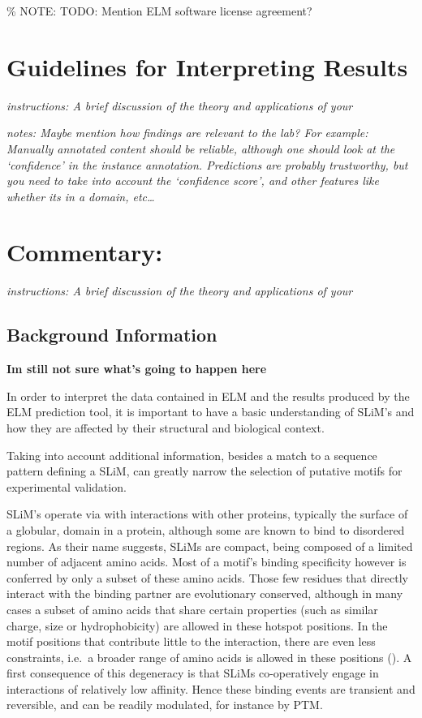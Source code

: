 \% NOTE: TODO: Mention ELM software license agreement?

\section{Guidelines for Interpreting
Results}\label{guidelines-for-interpreting-results}

\emph{instructions: A brief discussion of the theory and applications of
your}

\emph{notes: Maybe mention how findings are relevant to the lab? For
example: Manually annotated content should be reliable, although one
should look at the `confidence' in the instance annotation. Predictions
are probably trustworthy, but you need to take into account the
`confidence score', and other features like whether its in a domain,
etc\ldots{}}

\section{Commentary:}\label{commentary}

\emph{instructions: A brief discussion of the theory and applications of
your}

\subsection{Background Information}\label{background-information}

\textbf{Im still not sure what's going to happen here}

In order to interpret the data contained in ELM and the results produced
by the ELM prediction tool, it is important to have a basic
understanding of SLiM's and how they are affected by their structural
and biological context.

Taking into account additional information, besides a match to a
sequence pattern defining a SLiM, can greatly narrow the selection of
putative motifs for experimental validation.

SLiM's operate via with interactions with other proteins, typically the
surface of a globular, domain in a protein, although some are known to
bind to disordered regions. As their name suggests, SLiMs are compact,
being composed of a limited number of adjacent amino acids. Most of a
motif's binding specificity however is conferred by only a subset of
these amino acids. Those few residues that directly interact with the
binding partner are evolutionary conserved, although in many cases a
subset of amino acids that share certain properties (such as similar
charge, size or hydrophobicity) are allowed in these hotspot positions.
In the motif positions that contribute little to the interaction, there
are even less constraints, i.e.~a broader range of amino acids is
allowed in these positions (\cite{21909575}). A first consequence of
this degeneracy is that SLiMs co-operatively engage in interactions of
relatively low affinity. Hence these binding events are transient and
reversible, and can be readily modulated, for instance by PTM.


